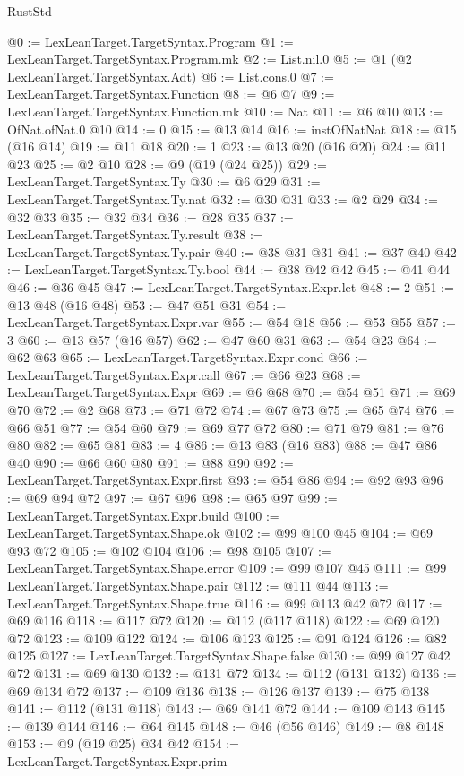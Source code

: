 \begin{lexlean}{RustStd}
\begin{coremodule}
{\begin{coremodule}
{{{{{{{{{@0 := LexLeanTarget.TargetSyntax.Program
@1 := LexLeanTarget.TargetSyntax.Program.mk
@2 := List.nil.{0}
@5 := @1 (@2 LexLeanTarget.TargetSyntax.Adt)
@6 := List.cons.{0}
@7 := LexLeanTarget.TargetSyntax.Function
@8 := @6 @7
@9 := LexLeanTarget.TargetSyntax.Function.mk
@10 := Nat
@11 := @6 @10
@13 := OfNat.ofNat.{0} @10
@14 := 0
@15 := @13 @14
@16 := instOfNatNat
@18 := @15 (@16 @14)
@19 := @11 @18
@20 := 1
@23 := @13 @20 (@16 @20)
@24 := @11 @23
@25 := @2 @10
@28 := @9 (@19 (@24 @25))
@29 := LexLeanTarget.TargetSyntax.Ty
@30 := @6 @29
@31 := LexLeanTarget.TargetSyntax.Ty.nat
@32 := @30 @31
@33 := @2 @29
@34 := @32 @33
@35 := @32 @34
@36 := @28 @35
@37 := LexLeanTarget.TargetSyntax.Ty.result
@38 := LexLeanTarget.TargetSyntax.Ty.pair
@40 := @38 @31 @31
@41 := @37 @40
@42 := LexLeanTarget.TargetSyntax.Ty.bool
@44 := @38 @42 @42
@45 := @41 @44
@46 := @36 @45
@47 := LexLeanTarget.TargetSyntax.Expr.let
@48 := 2
@51 := @13 @48 (@16 @48)
@53 := @47 @51 @31
@54 := LexLeanTarget.TargetSyntax.Expr.var
@55 := @54 @18
@56 := @53 @55
@57 := 3
@60 := @13 @57 (@16 @57)
@62 := @47 @60 @31
@63 := @54 @23
@64 := @62 @63
@65 := LexLeanTarget.TargetSyntax.Expr.cond
@66 := LexLeanTarget.TargetSyntax.Expr.call
@67 := @66 @23
@68 := LexLeanTarget.TargetSyntax.Expr
@69 := @6 @68
@70 := @54 @51
@71 := @69 @70
@72 := @2 @68
@73 := @71 @72
@74 := @67 @73
@75 := @65 @74
@76 := @66 @51
@77 := @54 @60
@79 := @69 @77 @72
@80 := @71 @79
@81 := @76 @80
@82 := @65 @81
@83 := 4
@86 := @13 @83 (@16 @83)
@88 := @47 @86 @40
@90 := @66 @60 @80
@91 := @88 @90
@92 := LexLeanTarget.TargetSyntax.Expr.first
@93 := @54 @86
@94 := @92 @93
@96 := @69 @94 @72
@97 := @67 @96
@98 := @65 @97
@99 := LexLeanTarget.TargetSyntax.Expr.build
@100 := LexLeanTarget.TargetSyntax.Shape.ok
@102 := @99 @100 @45
@104 := @69 @93 @72
@105 := @102 @104
@106 := @98 @105
@107 := LexLeanTarget.TargetSyntax.Shape.error
@109 := @99 @107 @45
@111 := @99 LexLeanTarget.TargetSyntax.Shape.pair
@112 := @111 @44
@113 := LexLeanTarget.TargetSyntax.Shape.true
@116 := @99 @113 @42 @72
@117 := @69 @116
@118 := @117 @72
@120 := @112 (@117 @118)
@122 := @69 @120 @72
@123 := @109 @122
@124 := @106 @123
@125 := @91 @124
@126 := @82 @125
@127 := LexLeanTarget.TargetSyntax.Shape.false
@130 := @99 @127 @42 @72
@131 := @69 @130
@132 := @131 @72
@134 := @112 (@131 @132)
@136 := @69 @134 @72
@137 := @109 @136
@138 := @126 @137
@139 := @75 @138
@141 := @112 (@131 @118)
@143 := @69 @141 @72
@144 := @109 @143
@145 := @139 @144
@146 := @64 @145
@148 := @46 (@56 @146)
@149 := @8 @148
@153 := @9 (@19 @25) @34 @42
@154 := LexLeanTarget.TargetSyntax.Expr.prim
}}}}}}}}}
\end{coremodule}}
\end{coremodule}
\end{lexlean}
